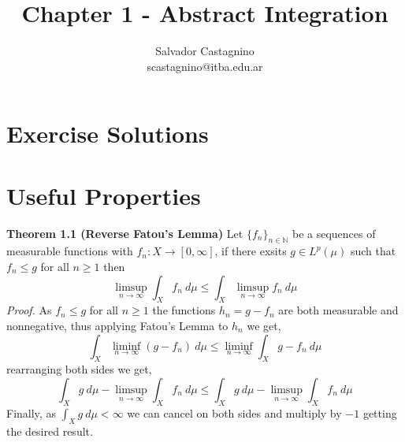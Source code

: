 \documentclass{article}
\author{Salvador Castagnino \\ scastagnino@itba.edu.ar}
\date{}
\title{Chapter 1 - Abstract Integration}
\begin{document}
\maketitle 

\section*{Exercise Solutions}

\section*{Useful Properties}

\begin{theorem}\textbf{Theorem 1.1 (Reverse Fatou's Lemma)}
    Let $\{f_n\}_{n \in \mathbb{N}}$ be a sequences of measurable functions with $f_n : X \rightarrow [0,\infty]$, if there exsits $g \in L^p \left( \mu \right) $ such that $f_n \le g$ for all $n \ge 1$ then 
    \[
        \limsup_{n \to \infty} \int_X f_n\: d\mu \le \int_X \limsup_{n \to \infty} f_n \: d\mu 
    \]
    \textit{Proof.} As $f_n \le g$ for all $n \ge 1$ the functions $h_n = g-f_n$ are both measurable and nonnegative, thus applying Fatou's Lemma to $h_n$ we get,
    \[
        \int_X \liminf_{n \to \infty} \left( g-f_n \right) \: d\mu \le \liminf_{n \to \infty} \int_X g-f_n\: d\mu 
    \]
    rearranging both sides we get,
    \[
        \int_X g\: d\mu - \limsup_{n \to \infty} \int_X f_n\: d\mu \le \int_X g\: d\mu - \limsup_{n \to \infty} \int_X f_n\: d\mu 
    \]
    Finally, as $\int_X g\: d\mu < \infty$ we can cancel on both sides and multiply by $-1$ getting the desired result.
\end{theorem}
\end{document}
